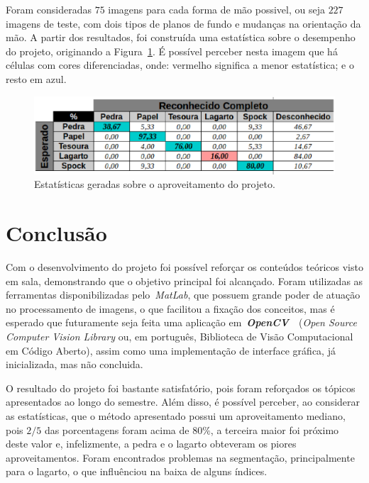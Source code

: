 \documentclass[conference]{Trabalho_Final}
\begin{document}
Foram consideradas $75$ imagens para cada forma de m\~ao possivel, ou seja $227$ imagens de teste, com dois tipos de planos de fundo e mudan\c{c}as na orienta\c{c}\~ao da m\~ao. A partir dos resultados, foi constru\'ida uma estat\'istica sobre o desempenho do projeto, originando a Figura~\ref{fig:estats}. \'E poss\'ivel perceber nesta imagem que h\'a c\'elulas com cores diferenciadas, onde: vermelho significa a menor estat\'istica; e o resto em azul.

\begin{figure}[]
  \centering
  \includegraphics[width = 9 cm]{Estatisticas}
  \caption{Estat\'isticas geradas sobre o aproveitamento do projeto.}
  \label{fig:estats}
\end{figure}


\section{Conclus\~ao}
  \label{conclusao}
Com o desenvolvimento do projeto foi poss\'ivel refor\c{c}ar os conte\'udos te\'oricos visto em sala, demonstrando que o objetivo principal foi alcan\c{c}ado. Foram utilizadas as ferramentas disponibilizadas pelo~\textit{MatLab}, que possuem grande poder de atua\c{c}\~ao no processamento de imagens, o que facilitou a fixa\c{c}\~ao dos conceitos, mas \'e esperado que futuramente seja feita uma aplica\c{c}\~ao em~\textit{\textbf{OpenCV}}~\cite{opencv}~(\textit{Open Source Computer Vision Library} ou, em portugu\^es, Biblioteca de Vis\~ao Computacional em C\'odigo Aberto), assim como uma implementa\c{c}\~ao de interface gr\'afica, j\'a inicializada, mas n\~ao concluida.

O resultado do projeto foi bastante satisfat\'orio, pois foram refor\c{c}ados os t\'opicos apresentados ao longo do semestre. Al\'em disso, \'e poss\'ivel perceber, ao considerar as estat\'isticas, que o m\'etodo apresentado possui um aproveitamento mediano, pois $2/5$ das porcentagens foram acima de $80\%$, a terceira maior foi pr\'oximo deste valor e, infelizmente, a pedra e o lagarto obteveram os piores aproveitamentos. Foram encontrados problemas na segmenta\c{c}\~ao, principalmente para o lagarto, o que influ\^enciou na baixa de alguns \'indices.
\end{document}
